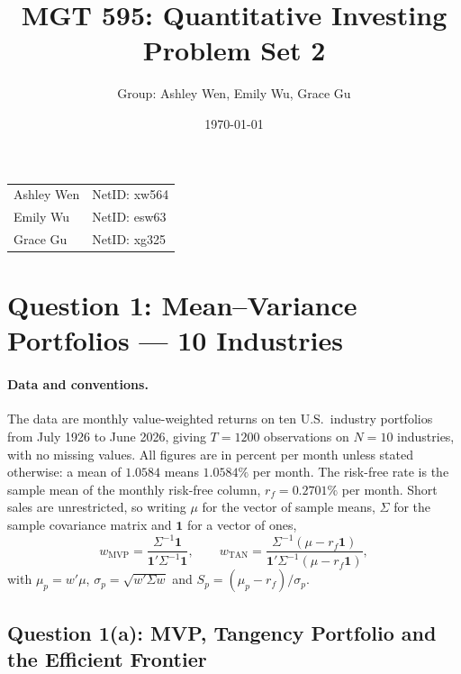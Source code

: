 \documentclass[11pt]{article}
\title{MGT 595: Quantitative Investing \\ Problem Set 2}
\author{Group: Ashley Wen, Emily Wu, Grace Gu}
\date{\today}
\begin{document}
\maketitle

\begin{center}
\begin{tabular}{ll}
Ashley Wen & NetID: xw564 \\
Emily Wu   & NetID: esw63 \\
Grace Gu   & NetID: xg325 \\
\end{tabular}
\end{center}

\vspace{1em}

\section{Question 1: Mean--Variance Portfolios --- 10 Industries}

\paragraph{Data and conventions.} The data are monthly value-weighted returns
on ten U.S.\ industry portfolios from July 1926 to June 2026, giving
$T = 1200$ observations on $N = 10$ industries, with no missing values. All
figures are in percent per month unless stated otherwise: a mean of $1.0584$
means $1.0584\%$ per month. The risk-free rate is the sample mean of the
monthly risk-free column, $r_f = 0.2701\%$ per month. Short sales are
unrestricted, so writing $\mu$ for the vector of sample means, $\Sigma$ for
the sample covariance matrix and $\mathbf{1}$ for a vector of ones,
\begin{equation}
w_{\text{MVP}} = \frac{\Sigma^{-1}\mathbf{1}}{\mathbf{1}'\Sigma^{-1}\mathbf{1}},
\qquad
w_{\text{TAN}} = \frac{\Sigma^{-1}(\mu - r_f\mathbf{1})}
                       {\mathbf{1}'\Sigma^{-1}(\mu - r_f\mathbf{1})},
\label{eq:weights}
\end{equation}
with $\mu_p = w'\mu$, $\sigma_p = \sqrt{w'\Sigma w}$ and
$S_p = (\mu_p - r_f)/\sigma_p$.

\subsection{Question 1(a): MVP, Tangency Portfolio and the Efficient Frontier}
\end{document}
